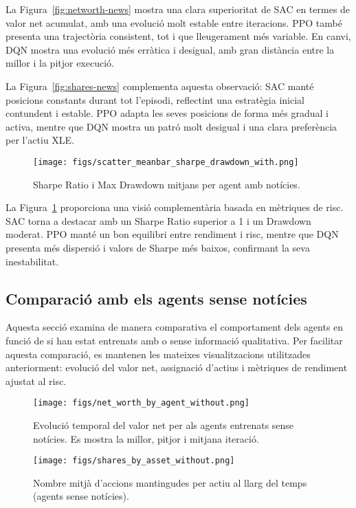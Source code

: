 \documentclass[12pt,a4paper,twoside]{book}
\begin{document}
La Figura~\ref{fig:networth-news} mostra una clara superioritat de SAC en termes de valor net acumulat, amb una evolució molt estable entre iteracions. PPO també presenta una trajectòria consistent, tot i que lleugerament més variable. En canvi, DQN mostra una evolució més erràtica i desigual, amb gran distància entre la millor i la pitjor execució.

La Figura~\ref{fig:shares-news} complementa aquesta observació: SAC manté posicions constants durant tot l’episodi, reflectint una estratègia inicial contundent i estable. PPO adapta les seves posicions de forma més gradual i activa, mentre que DQN mostra un patró molt desigual i una clara preferència per l’actiu XLE.

\begin{figure}[H]
\centering
\texttt{[image: figs/scatter\_meanbar\_sharpe\_drawdown\_with.png]}
\caption{Sharpe Ratio i Max Drawdown mitjans per agent amb notícies.}
\label{fig:sharpe-drawdown-news}
\end{figure}

La Figura~\ref{fig:sharpe-drawdown-news} proporciona una visió complementària basada en mètriques de risc. SAC torna a destacar amb un Sharpe Ratio superior a 1 i un Drawdown moderat. PPO manté un bon equilibri entre rendiment i risc, mentre que DQN presenta més dispersió i valors de Sharpe més baixos, confirmant la seva inestabilitat.

\subsection{Comparació amb els agents sense notícies}

Aquesta secció examina de manera comparativa el comportament dels agents en funció de si han estat entrenats amb o sense informació qualitativa. Per facilitar aquesta comparació, es mantenen les mateixes visualitzacions utilitzades anteriorment: evolució del valor net, assignació d’actius i mètriques de rendiment ajustat al risc.

\begin{figure}[H]
\centering
\texttt{[image: figs/net\_worth\_by\_agent\_without.png]}
\caption{Evolució temporal del valor net per als agents entrenats sense notícies. Es mostra la millor, pitjor i mitjana iteració.}
\label{fig:networth-without}
\end{figure}

\begin{figure}[H]
\centering
\texttt{[image: figs/shares\_by\_asset\_without.png]}
\caption{Nombre mitjà d'accions mantingudes per actiu al llarg del temps (agents sense notícies).}
\label{fig:shares-without}
\end{figure}
\end{document}
